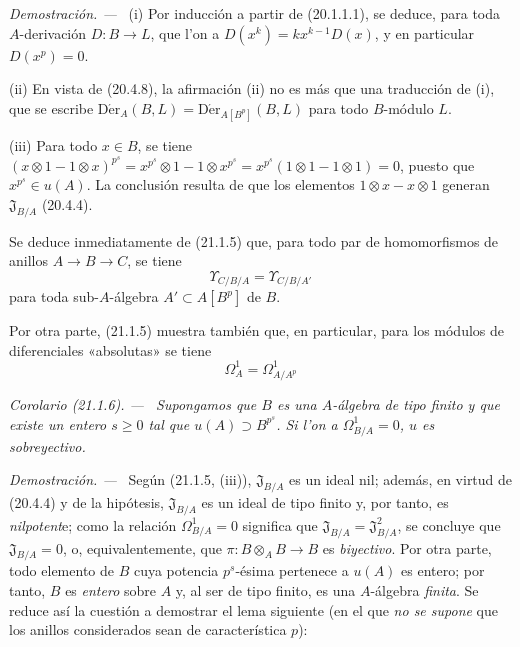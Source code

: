 \documentclass[10pt,oneside]{book}
\makeatletter
\newcommand{\setmanualcurrentlabel}[1]{\def\@currentlabel{#1}}
\newcommand{\oldpage}[2][]{%
  \setcounter{footnote}{0}%
  \marginpar{\scriptsize\textbf{#1}~|~#2}\ignorespaces}
\newenvironment{corollary}[1][]{%
  \setmanualcurrentlabel{#1}\par\medskip\noindent\itshape Corolario (#1). ---\ }{\par}
\newenvironment{proof}{%
  \par\medskip\noindent\textit{Demostración. ---\ }}{\par}
\providecommand{\setmin}{-}%
\makeatother
\begin{document}
\begin{proof}
(i) Por inducción a partir de (20.1.1.1), se deduce, para toda
$A$-derivación $D:B\to L$, que l'on a $D(x^k)=kx^{k-1}D(x)$, y en particular
$D(x^p)=0$.

(ii) En vista de (20.4.8), la afirmación (ii) no es más que una traducción
de (i), que se escribe
$\operatorname{D\acute{e}r}_A(B,L)=\operatorname{D\acute{e}r}_{A[B^p]}(B,L)$ para todo
$B$-módulo $L$.

(iii) Para todo $x\in B$, se tiene
$(x\otimes1\setmin1\otimes x)^{p^s}=x^{p^s}\otimes1\setmin1\otimes x^{p^s}=x^{p^s}(1\otimes1\setmin1\otimes1)=0$,
puesto que $x^{p^s}\in u(A)$. La conclusión resulta de que los elementos
$1\otimes x\setmin x\otimes1$ generan $\mathfrak J_{B/A}$ (20.4.4).
\end{proof}

Se deduce inmediatamente de (21.1.5) que, para todo par de homomorfismos de
anillos $A\to B\to C$, se tiene
\begin{equation}
\tag{21.1.5.1}
\label{0.21.1.5.1-es}
\Upsilon_{C/B/A}=\Upsilon_{C/B/A'}
\end{equation}
para toda sub-$A$-álgebra $A'\subset A[B^p]$ de $B$.

Por otra parte, (21.1.5) muestra también que, en particular, para los módulos de
diferenciales «absolutas» se tiene
\begin{equation}
\tag{21.1.5.2}
\label{0.21.1.5.2-es}
\Omega^1_A=\Omega^1_{A/A^p}
\end{equation}

\begin{corollary}[21.1.6]
\label{0.21.1.6-es}
Supongamos que $B$ es una $A$-álgebra de tipo finito y que existe un entero
$s\geq0$ tal que $u(A)\supset B^{p^s}$. Si l'on a $\Omega^1_{B/A}=0$, $u$ es
sobreyectivo.
\end{corollary}

\begin{proof}
\oldpage[0\textsubscript{IV-1}]{156}
Según (21.1.5, (iii)), $\mathfrak J_{B/A}$ es un ideal nil; además, en
virtud de (20.4.4) y de la hipótesis, $\mathfrak J_{B/A}$ es un ideal de tipo
finito y, por tanto, es \emph{nilpotent}e; como la relación $\Omega^1_{B/A}=0$
significa que $\mathfrak J_{B/A}=\mathfrak J_{B/A}^2$, se concluye que
$\mathfrak J_{B/A}=0$, o, equivalentemente, que
$\pi:B\otimes_A B\to B$ es \emph{biyectivo}.
Por otra parte, todo elemento de $B$ cuya potencia $p^s$-ésima pertenece a
$u(A)$ es entero; por tanto, $B$ es \emph{entero} sobre $A$ y, al ser de tipo finito,
es una $A$-álgebra \emph{finita}. Se reduce así la cuestión a demostrar el lema
siguiente (en el que \emph{no
se supone} que los anillos considerados sean de característica $p$):
\end{proof}
\end{document}
